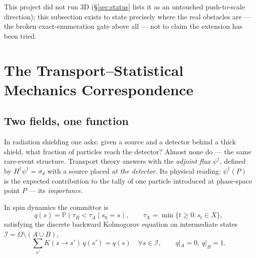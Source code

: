 \documentclass[11pt,a4paper]{article}
\newcommand{\Ical}{\mathcal{I}}
\begin{document}
This project did not run 3D (\S\ref{sec:status} lists it as an untouched push-to-scale
direction); this subsection exists to state precisely where the real obstacles are --- the broken
exact-enumeration gate above all --- not to claim the extension has been tried.

\section{The Transport--Statistical Mechanics Correspondence}\label{sec:corr}

\subsection{Two fields, one function}
In radiation shielding one asks: given a source and a detector behind a thick shield, what
fraction of particles reach the detector? Almost none do --- the same rare-event structure.
Transport theory answers with the \emph{adjoint flux} $\psi^\dagger$, defined by
$H^\dagger\psi^\dagger=\sigma_d$ with a source placed \emph{at the detector}. Its physical
reading: $\psi^\dagger(P)$ is the expected contribution to the tally of one particle introduced
at phase-space point $P$ --- its \emph{importance}.

In spin dynamics the committor is
\begin{equation}
q(s)=\mathbb{P}(\tau_B<\tau_A\mid s_0=s),\qquad \tau_X=\min\{t\ge0: s_t\in X\},
\end{equation}
satisfying the discrete backward Kolmogorov equation on intermediate states
$\Ical=\Omega\setminus(A\cup B)$,
\begin{equation}\label{eq:bke}
\sum_{s'}K(s\to s')\,q(s')=q(s)\quad\forall s\in\Ical,\qquad q|_A=0,\ q|_B=1.
\end{equation}
\end{document}
